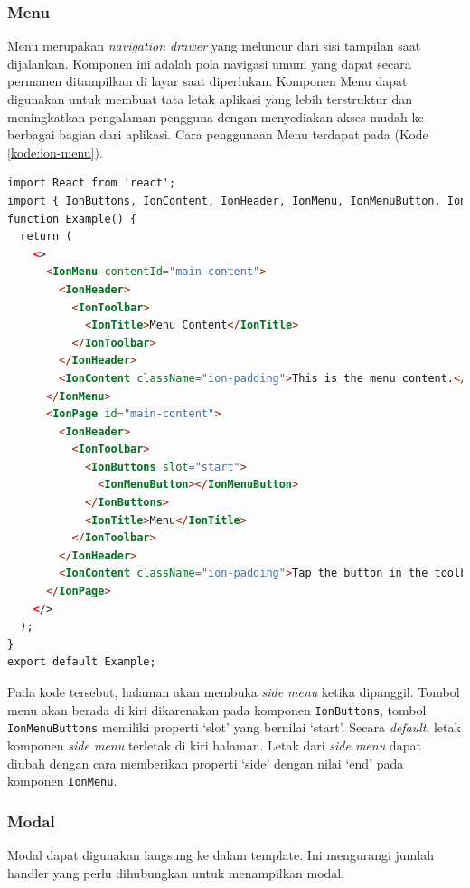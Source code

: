 \subsubsection{Menu}
Menu merupakan \textit{navigation drawer} yang meluncur dari sisi tampilan saat dijalankan. Komponen ini adalah pola navigasi umum yang dapat secara permanen ditampilkan di layar saat diperlukan. Komponen Menu dapat digunakan untuk membuat tata letak aplikasi yang lebih terstruktur dan meningkatkan pengalaman pengguna dengan menyediakan akses mudah ke berbagai bagian dari aplikasi. Cara penggunaan Menu terdapat pada (Kode \ref{kode:ion-menu}).

\begin{lstlisting}[language=HTML, caption=Contoh Kode Penggunaan Menu, label=kode:ion-menu]
import React from 'react';
import { IonButtons, IonContent, IonHeader, IonMenu, IonMenuButton, IonPage, IonTitle, IonToolbar } from '@ionic/react';
function Example() {
  return (
    <>
      <IonMenu contentId="main-content">
        <IonHeader>
          <IonToolbar>
            <IonTitle>Menu Content</IonTitle>
          </IonToolbar>
        </IonHeader>
        <IonContent className="ion-padding">This is the menu content.</IonContent>
      </IonMenu>
      <IonPage id="main-content">
        <IonHeader>
          <IonToolbar>
            <IonButtons slot="start">
              <IonMenuButton></IonMenuButton>
            </IonButtons>
            <IonTitle>Menu</IonTitle>
          </IonToolbar>
        </IonHeader>
        <IonContent className="ion-padding">Tap the button in the toolbar to open the menu.</IonContent>
      </IonPage>
    </>
  );
}
export default Example;
\end{lstlisting}

Pada kode tersebut, halaman akan membuka \textit{side menu} ketika dipanggil. Tombol menu akan berada di kiri dikarenakan pada komponen \texttt{IonButtons}, tombol \texttt{IonMenuButtons} memiliki properti `slot' yang bernilai `start'. Secara \textit{default}, letak komponen \textit{side menu} terletak di kiri halaman. Letak dari \textit{side menu} dapat diubah dengan cara memberikan properti `side' dengan nilai `end' pada komponen \texttt{IonMenu}.

\subsubsection{Modal}
Modal dapat digunakan langsung ke dalam template. Ini mengurangi jumlah handler yang perlu dihubungkan untuk menampilkan modal.

